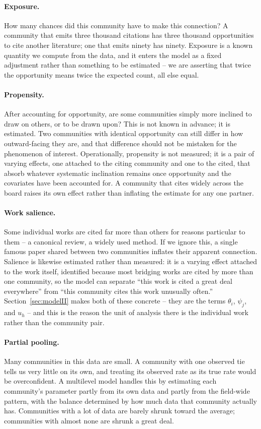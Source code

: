 \documentclass[11pt]{article}
\begin{document}
\paragraph{Exposure.} How many chances did this community have to make this connection? A
community that emits three thousand citations has three thousand opportunities to cite
another literature; one that emits ninety has ninety. Exposure is a known quantity we
compute from the data, and it enters the model as a fixed adjustment rather than something
to be estimated -- we are asserting that twice the opportunity means twice the expected
count, all else equal.

\paragraph{Propensity.} After accounting for opportunity, are some communities simply more
inclined to draw on others, or to be drawn upon? This is not known in advance; it is
estimated. Two communities with identical opportunity can still differ in how outward-facing
they are, and that difference should not be mistaken for the phenomenon of interest.
Operationally, propensity is not measured; it is a pair of varying effects, one attached to
the citing community and one to the cited, that absorb whatever systematic inclination
remains once opportunity and the covariates have been accounted for. A community that cites
widely across the board raises its own effect rather than inflating the estimate for any one
partner.

\paragraph{Work salience.} Some individual works are cited far more than others for reasons
particular to them -- a canonical review, a widely used method. If we ignore this, a single
famous paper shared between two communities inflates their apparent connection. Salience is
likewise estimated rather than measured: it is a varying effect attached to the work itself,
identified because most bridging works are cited by more than one community, so the model
can separate ``this work is cited a great deal everywhere'' from ``this community cites this
work unusually often.'' Section~\ref{sec:modelII} makes both of these concrete -- they are
the terms $\theta_i$, $\psi_j$, and $u_h$ -- and this is the reason the unit of analysis
there is the individual work rather than the community pair.

\paragraph{Partial pooling.} Many communities in this data are small. A community with one
observed tie tells us very little on its own, and treating its observed rate as its true
rate would be overconfident. A multilevel model handles this by estimating each community's
parameter partly from its own data and partly from the field-wide pattern, with the balance
determined by how much data that community actually has. Communities with a lot of data are
barely shrunk toward the average; communities with almost none are shrunk a great deal.
\end{document}

